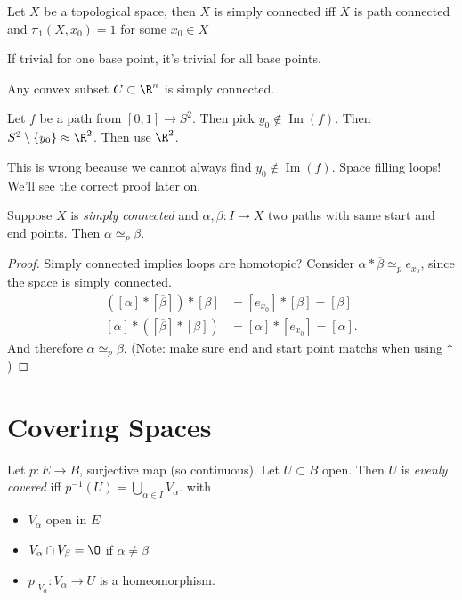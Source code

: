 \begin{definition}
    Let $X$ be a topological space, then $X$ is simply connected iff $X$ is path connected and $\pi_1(X, x_0) = 1$ for some $x_0 \in X$
\end{definition}

\begin{remark}
    If trivial for one base point, it's trivial for all base points.
\end{remark}

\begin{eg}
    Any convex subset $C \subset \R^n$ is simply connected.
\end{eg}
\begin{eg}
    Let $f$ be a path from  $[0, 1] \to  S^2$.
    Then pick $y_0 \not\in \operatorname{Im}(f)$. Then $S^2 \setminus \{ y_0\} \approx \R^2$.
    Then use $\R^2$.

    This is wrong because we cannot always find $y_0 \not\in  \operatorname{Im}(f)$. Space filling loops! We'll see the correct proof later on.
\end{eg}

\begin{lemma}
    Suppose $X$ is \emph{simply connected} and $\alpha, \beta: I \to  X$ two paths with same start and end points.
    Then $\alpha \simeq_p \beta$.
\end{lemma}
\begin{proof}
    Simply connected implies loops are homotopic?
    Consider $\alpha * \overline{\beta} \simeq_p  e_{x_0}$, since the space is simply connected.
    \begin{align*}
        ([\alpha] * [\overline{ \beta}]) * [\beta] &= [e_{x_0}] * [\beta] = [\beta]\\
        [\alpha] * ([\overline{ \beta}] * [\beta]) &= [\alpha] * [e_{x_0}] = [\alpha]
    .\end{align*}
    And therefore $\alpha \simeq_p  \beta$.
    (Note: make sure end and start point matchs when using $*$)
\end{proof}

\section{Covering Spaces}
\begin{definition}
    Let $p : E \to  B$, surjective map (so continuous).
    Let $U \subset B$ open.
    Then $U$ is \emph{evenly covered} iff $ p^{-1}(U) = \bigcup_{\alpha \in I} V_\alpha .$ 
    with
    \begin{itemize}
        \item $V_\alpha$ open in $E$ 
        \item $V_\alpha \cap V_\beta = \O$ if $\alpha \neq \beta$
        \item  $p|_{V_\alpha} : V_\alpha \to  U$ is a homeomorphism.
    \end{itemize}
\end{definition}

